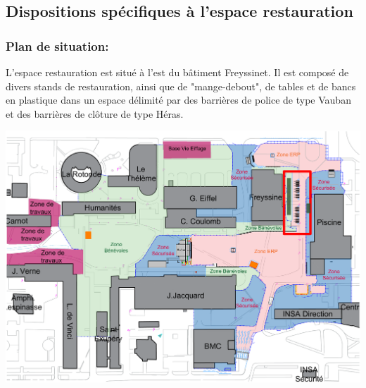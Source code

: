 \documentclass[hidelinks, paper=a4, fontsize=13pt]{report}
\begin{document}
\subsection{Dispositions spécifiques à l’espace restauration}

\subsubsection{Plan de situation:}
L’espace restauration est situé à l'est du bâtiment Freyssinet. Il est composé de divers stands de restauration, ainsi que de "mange-debout", de tables et de bancs en plastique dans un espace délimité par des barrières  de police de type Vauban et des barrières de clôture de type Héras.

\begin{center}
	\includegraphics[width=.8\textwidth,keepaspectratio]{Exports/Plan_24h_44eme-Espace_Resto}

\end{center}
\end{document}
